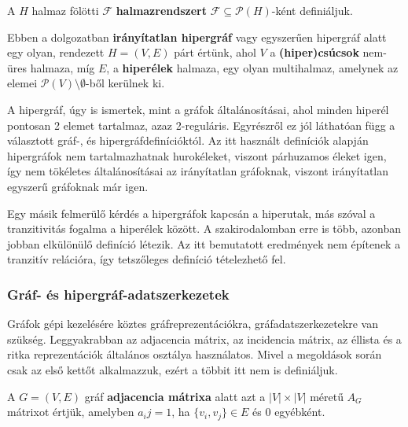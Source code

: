 \begin{definition}
A $H$ halmaz fölötti $\mathcal{F}$ \textbf{halmazrendszert} $\mathcal{F} \subseteq \mathcal{P}(H)$-ként definiáljuk.
\end{definition}

\begin{definition}
Ebben a dolgozatban \textbf{irányítatlan hipergráf} vagy egyszerűen hipergráf alatt egy olyan, rendezett $H=(V,E)$ párt értünk, ahol $V$ a \textbf{(hiper)csúcsok} nem-üres halmaza, míg $E$, a \textbf{hiperélek} halmaza, egy olyan multihalmaz, amelynek az elemei $\mathcal{P}(V) \setminus \emptyset$-ből kerülnek ki.
\end{definition}

\begin{note}
A hipergráf, úgy is ismertek, mint a gráfok általánosításai, ahol minden hiperél pontosan 2 elemet tartalmaz, azaz 2-reguláris. Egyrészről ez jól láthatóan függ a választott gráf-, és hipergráfdefinícióktól. Az itt használt definíciók alapján hipergráfok nem tartalmazhatnak hurokéleket, viszont párhuzamos éleket igen, így nem tökéletes általánosításai az irányítatlan gráfoknak, viszont irányítatlan egyszerű gráfoknak már igen.
\end{note}

\begin{note}
Egy másik felmerülő kérdés a hipergráfok kapcsán a hiperutak, más szóval a tranzitivitás fogalma a hiperélek között. A szakirodalomban erre is több, azonban jobban elkülönülő definíció létezik. Az itt bemutatott eredmények nem építenek a tranzitív relációra, így tetszőleges definíció tételezhető fel.
\end{note}

\subsubsection{Gráf- és hipergráf-adatszerkezetek} \label{adsDefinitions}

Gráfok gépi kezelésére köztes gráfreprezentációkra, gráfadatszerkezetekre van szükség. Leggyakrabban az adjacencia mátrix, az incidencia mátrix, az éllista és a ritka reprezentációk általános osztálya használatos. Mivel a megoldások során csak az első kettőt alkalmazzuk, ezért a többit itt nem is definiáljuk.

\begin{definition}
A $G=(V,E)$ gráf \textbf{adjacencia mátrixa} alatt azt a $|V| \times |V|$ méretű $A_G$ mátrixot értjük, amelyben $a_ij=1$, ha $\{v_i, v_j\} \in E$ és 0 egyébként.
\end{definition}

